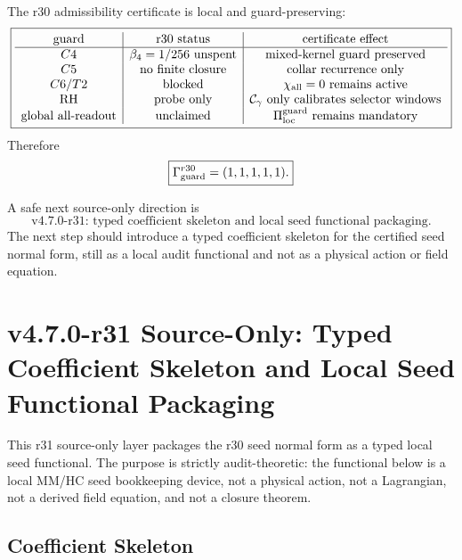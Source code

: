 The r30 admissibility certificate is local and guard-preserving:
\[
\boxed{
\begin{array}{c|c|c}
\text{guard} & \text{r30 status} & \text{certificate effect}\\
\hline
C4 & \beta_4=1/256\text{ unspent} & \text{mixed-kernel guard preserved}\\
C5 & \text{no finite closure} & \text{collar recurrence only}\\
C6/T2 & \text{blocked} & \chi_{\rm all}=0\text{ remains active}\\
\text{RH} & \text{probe only} & \mathcal C_{\gamma}\text{ only calibrates selector windows}\\
\text{global all-readout} & \text{unclaimed} & \Pi_{\rm loc}^{\rm guard}\text{ remains mandatory}
\end{array}
}
\]
Therefore
\[
\boxed{
\Gamma_{\rm guard}^{r30}=(1,1,1,1,1).
}
\]

A safe next source-only direction is
\[
\boxed{
\text{v4.7.0-r31: typed coefficient skeleton and local seed functional packaging.}
}
\]
The next step should introduce a typed coefficient skeleton for the certified
seed normal form, still as a local audit functional and not as a physical action
or field equation.



\section{v4.7.0-r31 Source-Only: Typed Coefficient Skeleton and Local Seed Functional Packaging}
\label{sec:v470-r31-typed-coeff-skeleton-seed-functional}

This r31 source-only layer packages the r30 seed normal form as a typed local
seed functional.  The purpose is strictly audit-theoretic: the functional below
is a local MM/HC seed bookkeeping device, not a physical action, not a
Lagrangian, not a derived field equation, and not a closure theorem.

\subsection{Coefficient Skeleton}
\label{subsec:r31-coefficient-skeleton}

